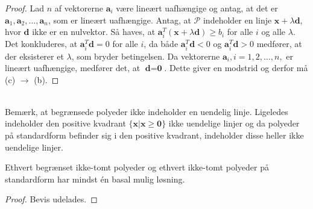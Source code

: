 \begin{proof}
%
Lad $n$ af vektorerne $\textbf{a}_i$ være lineært uafhængige og antag, at det er $\textbf{a}_1, \textbf{a}_2, \ldots , \textbf{a}_n$, som er lineært uafhængige.
Antag, at $\mathcal{P}$ indeholder en linje $\textbf{x} + \lambda \textbf{d}$, hvor $\textbf{d}$ ikke er en nulvektor.
Så haves, at $\textbf{a}_i^T (\textbf{x} + \lambda \textbf{d}) \geq b_i$ for alle $i$ og alle $\lambda$.
Det konkluderes, at $\textbf{a}_i^T \textbf{d} = 0$ for alle $i$, da både  $\textbf{a}_i^T \textbf{d} < 0$ og  $\textbf{a}_i^T \textbf{d} > 0$ medfører, at der eksisterer et $\lambda$, som bryder betingelsen.
Da vektorerne $\textbf{a}_i, i = 1, 2, \ldots, n,$ er lineært uafhængige, medfører det, at $\textbf{d}=\textbf{0}$.
Dette giver en modstrid og derfor må (c) $\rightarrow$ (b).
\end{proof}\\
%
Bemærk, at begrænsede polyeder ikke indeholder en uendelig linje.
Ligeledes indeholder den positive kvadrant $\{ \textbf{x}|\textbf{x} \geq \textbf{0}\}$ ikke uendelige linjer og da polyeder på standardform befinder sig i den positive kvadrant, indeholder disse heller ikke uendelige linjer.
%
\begin{kor}{}{}
Ethvert begrænset ikke-tomt polyeder og ethvert ikke-tomt polyeder på standardform har mindst én basal mulig løsning.
\end{kor}
%
\begin{proof}
Bevis udelades.
\end{proof}